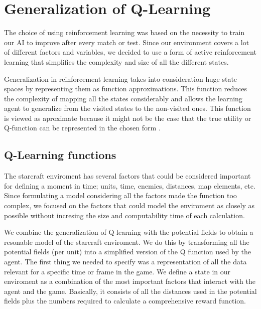 
\section{Generalization of Q-Learning}	\label{qlearning}

The choice of using reinforcement learning was based on the necessity to train our AI to improve after every match or test. Since our environment covers a lot of different factors and variables, we decided to use a form of active reinforcement learning that simplifies the complexity and size of all the different states. 

Generalization in reinforcement learning takes into consideration huge state spaces by representing them as function approximations. This function reduces the complexity of mapping all the states considerably and allows the learning agent to generalize from the visited states to the non-visited ones. This function is viewed as aproximate because it might not be the case that the true utility or Q-function can be represented in the chosen form \cite[p777]{rl}. 

\subsection{Q-Learning functions}

The starcraft enviroment has several factors that could be considered important for defining a moment in time; units, time, enemies, distances, map elements, etc. Since formulating a model considering all the factors made the function too complex, we focused on the factors that could model the enviroment as closely as possible without incresing the size and computability time of each calculation. 

We combine the generalization of Q-learning with the potential fields to obtain a resonable model of the starcraft enviroment. We do this by transforming all the potential fields (per unit) into a simplified version of the Q function used by the agent. The first thing we needed to specify was a representation of all the data relevant for a specific time or frame in the game. We define a state in our enviroment as a combination of the most important factors that interact with the agent and the game. Basically, it consists of all the distances used in the potential fields plus the numbers required to calculate a comprehensive reward function. 

